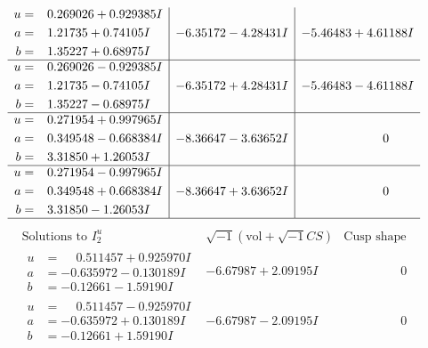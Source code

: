\documentclass[1p]{elsarticle_modified}
\theoremstyle{definition}
\newcommand{\I}{\sqrt{-1}}
\begin{document}
$$\begin{array}{c|c|c}
\begin{aligned}
u &= \phantom{-}0.269026 + 0.929385 I \\
a &= \phantom{-}1.21735 + 0.74105 I \\
b &= \phantom{-}1.35227 + 0.68975 I\end{aligned}
 & -6.35172 - 4.28431 I & -5.46483 + 4.61188 I \\ \hline\begin{aligned}
u &= \phantom{-}0.269026 - 0.929385 I \\
a &= \phantom{-}1.21735 - 0.74105 I \\
b &= \phantom{-}1.35227 - 0.68975 I\end{aligned}
 & -6.35172 + 4.28431 I & -5.46483 - 4.61188 I \\ \hline\begin{aligned}
u &= \phantom{-}0.271954 + 0.997965 I \\
a &= \phantom{-}0.349548 - 0.668384 I \\
b &= \phantom{-}3.31850 + 1.26053 I\end{aligned}
 & -8.36647 - 3.63652 I & \phantom{-0.000000 } 0 \\ \hline\begin{aligned}
u &= \phantom{-}0.271954 - 0.997965 I \\
a &= \phantom{-}0.349548 + 0.668384 I \\
b &= \phantom{-}3.31850 - 1.26053 I\end{aligned}
 & -8.36647 + 3.63652 I & \phantom{-0.000000 } 0\\
 \hline 
 \end{array}$$\newpage$$\begin{array}{c|c|c}  
\text{Solutions to }I^u_{2}& \I (\text{vol} + \sqrt{-1}CS) & \text{Cusp shape}\\
 \hline 
\begin{aligned}
u &= \phantom{-}0.511457 + 0.925970 I \\
a &= -0.635972 - 0.130189 I \\
b &= -0.12661 - 1.59190 I\end{aligned}
 & -6.67987 + 2.09195 I & \phantom{-0.000000 } 0 \\ \hline\begin{aligned}
u &= \phantom{-}0.511457 - 0.925970 I \\
a &= -0.635972 + 0.130189 I \\
b &= -0.12661 + 1.59190 I\end{aligned}
 & -6.67987 - 2.09195 I & \phantom{-0.000000 } 0 \\ \hline\begin{aligned}

\end{aligned}
\end{array}$$
\end{document}
